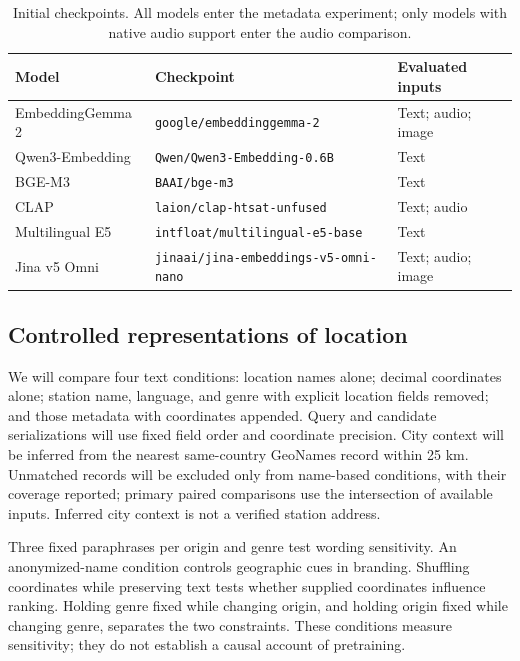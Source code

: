 \documentclass[10pt]{article}
\begin{document}
\begin{table}[H]
\centering
\caption{Initial checkpoints. All models enter the metadata experiment; only models with native audio support enter the audio comparison.}
\label{tab:models}
\begin{tabularx}{\linewidth}{@{}lXl@{}}
\toprule
Model & Checkpoint & Evaluated inputs\\
\midrule
EmbeddingGemma 2 \citep{embeddinggemma2}&\texttt{google/embeddinggemma-2}&Text; audio; image\\
Qwen3-Embedding \citep{zhang2025qwen}&\texttt{Qwen/Qwen3-Embedding-0.6B}&Text\\
BGE-M3 \citep{chen2024m3}&\texttt{BAAI/bge-m3}&Text\\
CLAP \citep{wu2023clap}&\texttt{laion/clap-htsat-unfused}&Text; audio\\
Multilingual E5 \citep{wang2024e5}&\texttt{intfloat/multilingual-e5-base}&Text\\
Jina v5 Omni \citep{honicke2026jinav5omni}&\texttt{jinaai/jina-\allowbreak embeddings-\allowbreak v5-omni-nano}&Text; audio; image\\
\bottomrule
\end{tabularx}
\end{table}

\subsection{Controlled representations of location}
We will compare four text conditions: location names alone; decimal coordinates alone; station name, language, and genre with explicit location fields removed; and those metadata with coordinates appended. Query and candidate serializations will use fixed field order and coordinate precision. City context will be inferred from the nearest same-country GeoNames record within 25 km. Unmatched records will be excluded only from name-based conditions, with their coverage reported; primary paired comparisons use the intersection of available inputs. Inferred city context is not a verified station address.

Three fixed paraphrases per origin and genre test wording sensitivity. An anonymized-name condition controls geographic cues in branding. Shuffling coordinates while preserving text tests whether supplied coordinates influence ranking. Holding genre fixed while changing origin, and holding origin fixed while changing genre, separates the two constraints. These conditions measure sensitivity; they do not establish a causal account of pretraining.
\end{document}
